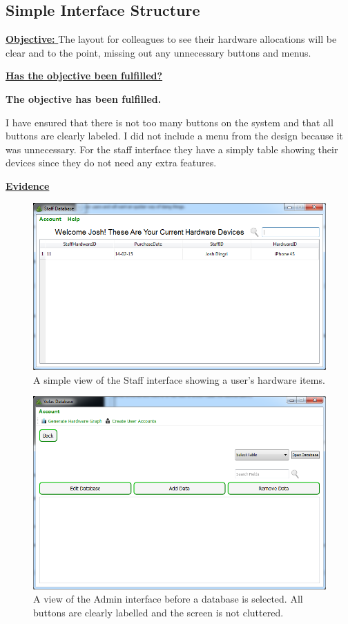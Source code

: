 \subsection{Simple Interface Structure}\label{interface}

\underline{\textbf{Objective:} }  The layout for colleagues to see their hardware allocations will be clear and to the point, missing out any unnecessary buttons and menus.

\underline{\textbf{Has the objective been fulfilled?}}

\textbf{The objective has been fulfilled.}

I have ensured that there is not too many buttons on the system and that all buttons are clearly labeled. I did not include a menu from the design because it was unnecessary. For the staff interface they have a simply table showing their devices  since they do not need any extra features. 

\underline{\textbf{Evidence}}

\begin{figure}[H]
    \includegraphics[width=\textwidth]{./Evaluation/Images/staffhardwaredevice.png}
    \caption{A simple view of the Staff interface showing a user's hardware items.} 
\end{figure}

\begin{figure}[H]
    \includegraphics[width=\textwidth]{./Evaluation/Images/clearlabels.png}
    \caption{A view of the Admin interface before a database is selected. All buttons are clearly labelled and the screen is not cluttered.} 
\end{figure}


